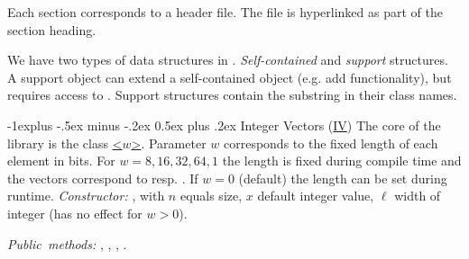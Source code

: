 \documentclass[10pt,landscape]{article}
\makeatletter
\renewcommand{\subsection}{\@startsection{subsection}{2}{0mm}%
                                {-1explus -.5ex minus -.2ex}%
                                {0.5ex plus .2ex}%
                                {\normalfont\normalsize\bfseries}}
\makeatother
\begin{document}
\begin{multicols}{3}
Each section corresponds to a header file. The file
is hyperlinked as part of the section heading.

We have two types of data structures in \sdsl.
\emph{Self-contained} and \emph{support}
structures. A support object  can extend
a self-contained object  (e.g. add functionality), but 
requires access to . Support structures contain
the substring  in their class names.

\subsection{Integer Vectors (\href{\sdslgitinc/vectors.hpp}{IV})}
The core of the library is the class 
\href{\sdslgitinc/int_vector.hpp}{\sdslintvector\textless$w$\textgreater}.
Parameter $w$ corresponds to the fixed length of each
element in bits.  For $w=8,16,32,64,1$ the length is
fixed during compile time and the vectors
correspond to \href{http://www.sgi.com/tech/stl/Vector.html}{}
resp. .
If $w=0$ (default) the length can be set during runtime.
\textit{Constructor:} \sdslintvectorZ{}, with 
$n$ equals size, $x$ default integer value, $\ell$ width
of integer (has no effect for $w>0$).

\textit{Public~methods:} , , , 
. 


\end{multicols}
\end{document}
